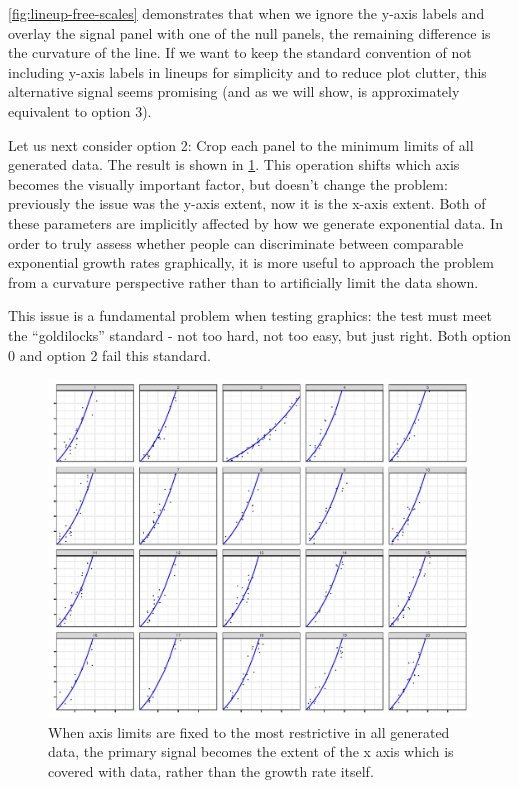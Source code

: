 \documentclass[12pt]{article}
\begin{document}
\cref{fig:lineup-free-scales} demonstrates that when we ignore the
y-axis labels and overlay the signal panel with one of the null panels,
the remaining difference is the curvature of the line. If we want to
keep the standard convention of not including y-axis labels in lineups
for simplicity and to reduce plot clutter, this alternative signal seems
promising (and as we will show, is approximately equivalent to option
3).

Let us next consider option 2: Crop each panel to the minimum limits of
all generated data. The result is shown in
\cref{fig:lineup-truncate-scales}. This operation shifts which axis
becomes the visually important factor, but doesn't change the problem:
previously the issue was the y-axis extent, now it is the x-axis extent.
Both of these parameters are implicitly affected by how we generate
exponential data. In order to truly assess whether people can
discriminate between comparable exponential growth rates graphically, it
is more useful to approach the problem from a curvature perspective
rather than to artificially limit the data shown.

This issue is a fundamental problem when testing graphics: the test must
meet the ``goldilocks'' standard - not too hard, not too easy, but just
right. Both option 0 and option 2 fail this standard.

\begin{figure}[tbp]

{\centering \includegraphics[width=.6\linewidth,]{appendix_files/figure-latex/lineup-truncate-scales-1} 

}

\caption{When axis limits are fixed to the most restrictive in all generated data, the primary signal becomes the extent of the x axis which is covered with data, rather than the growth rate itself.}\label{fig:lineup-truncate-scales}
\end{figure}
\end{document}
